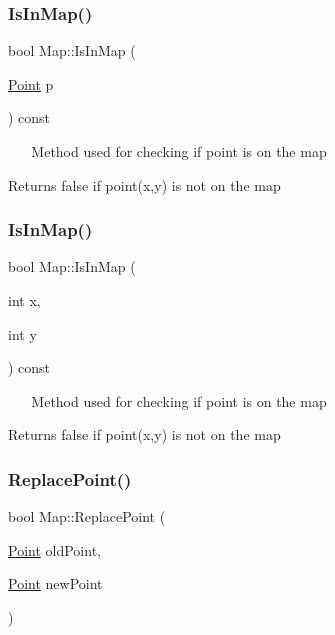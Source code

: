 \subsubsection{\texorpdfstring{Is\+In\+Map()}{IsInMap()}\hspace{0.1cm}{\footnotesize\ttfamily [1/2]}}
{\footnotesize\ttfamily bool Map\+::\+Is\+In\+Map (\begin{DoxyParamCaption}\item[{\mbox{\hyperlink{class_point}{Point}}}]{p }\end{DoxyParamCaption}) const}



~\newline
~\newline
Method used for checking if point is on the map 

\begin{DoxyReturn}{Returns}
false if point(x,y) is not on the map 
\end{DoxyReturn}
\mbox{\label{class_map_a7b9c227621696cda01445fdae6a3c80d}} 
\subsubsection{\texorpdfstring{Is\+In\+Map()}{IsInMap()}\hspace{0.1cm}{\footnotesize\ttfamily [2/2]}}
{\footnotesize\ttfamily bool Map\+::\+Is\+In\+Map (\begin{DoxyParamCaption}\item[{int}]{x,  }\item[{int}]{y }\end{DoxyParamCaption}) const}



~\newline
~\newline
Method used for checking if point is on the map 

\begin{DoxyReturn}{Returns}
false if point(x,y) is not on the map 
\end{DoxyReturn}
\mbox{\label{class_map_aacc4374e1b3984d54ecbaf9fa488d08e}} 
\subsubsection{\texorpdfstring{Replace\+Point()}{ReplacePoint()}}
{\footnotesize\ttfamily bool Map\+::\+Replace\+Point (\begin{DoxyParamCaption}\item[{\mbox{\hyperlink{class_point}{Point}}}]{old\+Point,  }\item[{\mbox{\hyperlink{class_point}{Point}}}]{new\+Point }\end{DoxyParamCaption})}



